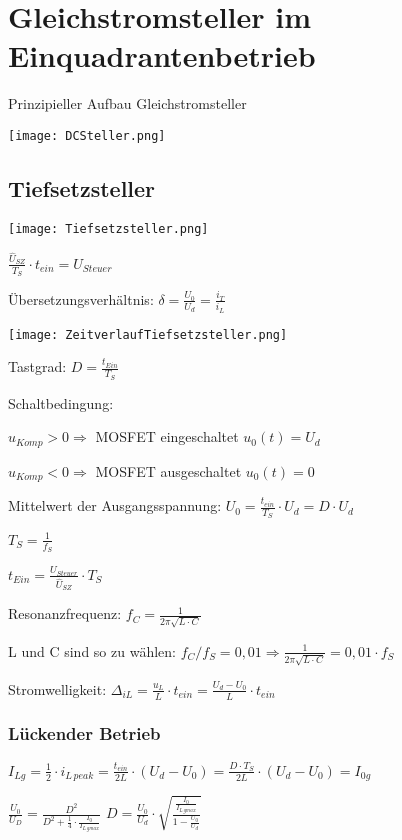 \documentclass[german]{latex4ei/latex4ei_sheet}
\begin{document}
\section{Gleichstromsteller im Einquadrantenbetrieb}
	\begin{sectionbox}
		Prinzipieller Aufbau Gleichstromsteller

		\texttt{[image: DCSteller.png]}
		\subsection{Tiefsetzsteller}
			\begin{bluebox}
				\item \texttt{[image: Tiefsetzsteller.png]}
				\item $\frac{\hat{U}_{SZ}}{T_S}\cdot t_{ein} = U_{Steuer}$
				\item Übersetzungsverhältnis: $\delta = \frac{U_0}{U_d} = \frac{i_T}{i_L}$
				\item 
				\item \texttt{[image: ZeitverlaufTiefsetzsteller.png]}
				\item Tastgrad: $D = \frac{t_{Ein}}{T_S}$
				\item Schaltbedingung:
				\item $u_{Komp} > 0 \Rightarrow $ MOSFET eingeschaltet $u_0(t) = U_d$
				\item $u_{Komp} < 0 \Rightarrow $ MOSFET ausgeschaltet $ u_0(t) = 0$
				\item Mittelwert der Ausgangsspannung: $U_0 = \frac{t_{ein}}{T_S}\cdot U_d = D \cdot U_d$
				\item $T_S = \frac{1}{f_S}$
				\item $t_{Ein} = \frac{U_{Steuer}}{\hat{U}_{SZ}}\cdot T_S$
				\item Resonanzfrequenz: $f_C = \frac{1}{2\pi \sqrt{L\cdot C}}$
				\item L und C sind so zu wählen: $f_C/f_S = 0,01\Rightarrow \frac{1}{2\pi\sqrt{L\cdot C}} = 0,01\cdot f_S$
				\item Stromwelligkeit: $\Delta_{iL} = \frac{u_L}{L}\cdot t_{ein} = \frac{U_d-U_0}{L}\cdot t_{ein}$
			\end{bluebox}
			\subsubsection{Lückender Betrieb}
				\begin{bluebox}
					\item $I_{Lg} = \frac{1}{2}\cdot i_{L\,peak} = \frac{t_{ein}}{2L}\cdot (U_d-U_0) = \frac{D\cdot T_S}{2L}\cdot (U_d-U_0) = I_{0g}$
					\item $\frac{U_0}{U_D} = \frac{D^2}{D^2+\frac{1}{4}\cdot \frac{I_0}{I_{L\,gmax}}}$
					\qquad $D = \frac{U_0}{U_d}\cdot \sqrt{\frac{\frac{I_0}{I_{L\,gmax}}}{1-\frac{U_0}{U_d}}}$
				\end{bluebox}	
	\end{sectionbox}
\end{document}
